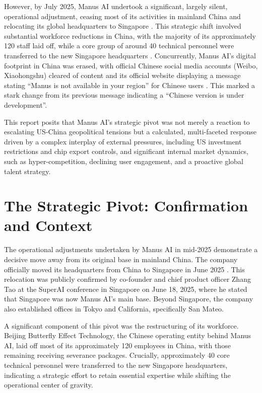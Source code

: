 However, by July 2025, Manus AI undertook a significant, largely silent, operational adjustment, ceasing most of its activities in mainland China and relocating its global headquarters to Singapore \cite{techinasia_manus_singapore}.
This strategic shift involved substantial workforce reductions in China, with the majority of its approximately 120 staff laid off, while a core group of around 40 technical personnel were transferred to the new Singapore headquarters \cite{youtube_manus_withdrawal}.
Concurrently, Manus AI's digital footprint in China was erased, with official Chinese social media accounts (Weibo, Xiaohongshu) cleared of content and its official website displaying a message stating ``Manus is not available in your region'' for Chinese users \cite{aibase_manus_changes}.
This marked a stark change from its previous message indicating a ``Chinese version is under development''.

This report posits that Manus AI's strategic pivot was not merely a reaction to escalating US-China geopolitical tensions but a calculated, multi-faceted response driven by a complex interplay of external pressures, including US investment restrictions and chip export controls, and significant internal market dynamics, such as hyper-competition, declining user engagement, and a proactive global talent strategy.

\section{The Strategic Pivot: Confirmation and Context}

The operational adjustments undertaken by Manus AI in mid-2025 demonstrate a decisive move away from its original base in mainland China.
The company officially moved its headquarters from China to Singapore in June 2025 \cite{decoder_manus_geopolitical, onlinecitizen_manus_relocates, youtube_manus_withdrawal, cna_manus_relocates, citynews_manus_relocates}.
This relocation was publicly confirmed by co-founder and chief product officer Zhang Tao at the SuperAI conference in Singapore on June 18, 2025, where he stated that Singapore was now Manus AI's main base.
Beyond Singapore, the company also established offices in Tokyo and California, specifically San Mateo.

A significant component of this pivot was the restructuring of its workforce.
Beijing Butterfly Effect Technology, the Chinese operating entity behind Manus AI, laid off most of its approximately 120 employees in China, with those remaining receiving severance packages.
Crucially, approximately 40 core technical personnel were transferred to the new Singapore headquarters, indicating a strategic effort to retain essential expertise while shifting the operational center of gravity.

